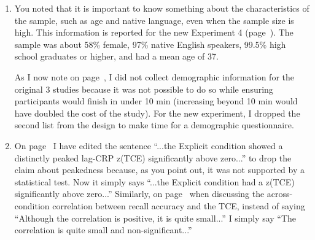 \documentclass[12pt]{article}
\begin{document}
\begin{enumerate}
\item
	You noted that it is important to know something about the characteristics of the sample, such as age and native language, even when the sample size is high. This information is reported for the new Experiment 4 (page~\pageref{newexp}). The sample was about 58\% female, 97\% native English speakers, 99.5\% high school graduates or higher, and had a mean age of 37.

	As I now note on page~\pageref{TODO-10}, I did not collect demographic information for the original 3 studies because it was not possible to do so while ensuring participants would finish in under 10 min (increasing beyond 10 min would have doubled the cost of the study). For the new experiment, I dropped the second list from the design to make time for a demographic questionnaire. %

\item
	On page~\pageref{done-11} I have edited the sentence ``...the Explicit condition showed a distinctly peaked lag-CRP z(TCE) significantly above zero...'' to drop the claim about peakedness because, as you point out, it was not supported by a statistical test. Now it simply says ``...the Explicit condition had a z(TCE) significantly above zero...''
	Similarly, on page~\pageref{done-12} when discussing the across-condition correlation between recall accuracy and the TCE, instead of saying ``Although the correlation is positive, it is quite small...'' I simply say ``The correlation is quite small and non-significant...'' 


\end{enumerate}
\end{document}
